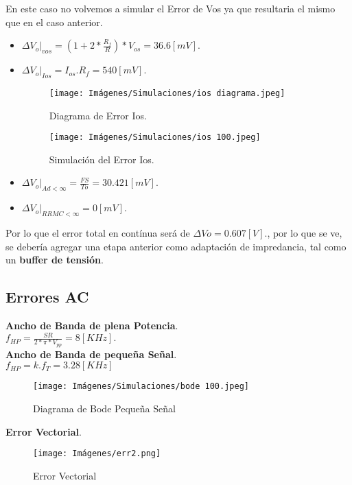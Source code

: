 En este caso no volvemos a simular el Error de Vos ya que resultaria el mismo que en el caso anterior.
\begin{itemize}

    \item $\Delta V_{o}|_{vos} = (1 + 2*\frac{R_f}{R})*V_{os} = 36.6 [mV].$
    \item $\Delta V_{o}|_{Ios} = I_{os}.R_f = 540 [mV].$
    \begin{figure}[H]
    \centering
    \begin{minipage}{0.48\textwidth}
        \centering
        \texttt{[image: Imágenes/Simulaciones/ios diagrama.jpeg]}
        \caption{Diagrama de Error Ios.}
        \label{fig:diagrama_vos}
    \end{minipage}
    \hfill
    \begin{minipage}{0.48\textwidth}
        \centering
        \texttt{[image: Imágenes/Simulaciones/ios 100.jpeg]}
        \caption{Simulación del Error Ios.}
        \label{fig:simu_vos}
    \end{minipage}
\end{figure}
    \item $\Delta V_{o}|_{Ad < \infty} = \frac{FS}{To} = 30.421 [mV].$
    \item $\Delta V_{o}|_{RRMC < \infty} = 0 [mV].$
\end{itemize}

Por lo que el error total en contínua será de $\Delta Vo = 0.607 [V].$, por lo que se ve, se debería agregar una etapa anterior como adaptación de impredancia, tal como un \textbf{buffer de tensión}.\\

\subsection{Errores AC}
\textbf{Ancho de Banda de plena Potencia}.\\

$f_{HP} = \frac{SR}{2*\pi*V_{pp}} = 8 [KHz].$\\

\textbf{Ancho de Banda de pequeña Señal}.\\

$f_{HP} = k.f_T = 3.28 [KHz]$\\
\begin{figure}[H]
    	\centering
    	\texttt{[image: Imágenes/Simulaciones/bode 100.jpeg]}
    	\caption{Diagrama de Bode Pequeña Señal}
    \end{figure}
\newpage
\textbf{Error Vectorial}.\\

    \begin{figure}[ht]
    	\centering
    	\texttt{[image: Imágenes/err2.png]}
    	\caption{Error Vectorial}
    \end{figure}

